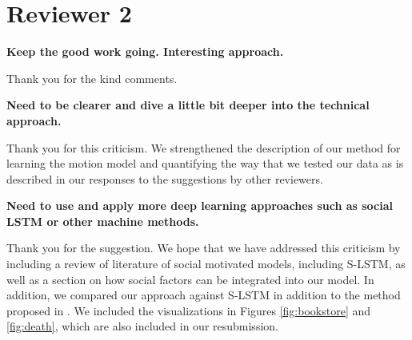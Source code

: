 \documentclass[usenames,dvipsnames]{article}
\begin{document}
\section*{Reviewer 2}
\begin{enumerate}
\begin{item}
\textbf{Keep the good work going. Interesting approach.}
\end{item}

Thank you for the kind comments.

\begin{item}
\textbf{
Need to be clearer and
dive a little bit deeper into the technical approach. }

Thank you for this criticism. 
We strengthened the description of our method for learning the motion model and quantifying the way that we tested our data as is described in our responses to the suggestions by other reviewers.

\end{item}


\begin{item}
\textbf{
Need to use and apply more deep learning approaches such as social LSTM
or other machine methods.}

Thank you for the suggestion. 
We hope that we have addressed this criticism by including a review of literature of social motivated models, including S-LSTM, as well as a section on how social factors can be integrated into our model. 
In addition, we compared our approach against S-LSTM in addition to the method proposed in \cite{Kitani2012}. 
We included the visualizations in Figures \ref{fig:bookstore} and \ref{fig:death}, which are also included in our resubmission.

 \begin{figure}[t!]
  \begin{subfigure}[t]{0.5\textwidth}



\end{subfigure}
\end{figure}
\end{item}
\end{enumerate}
\end{document}
